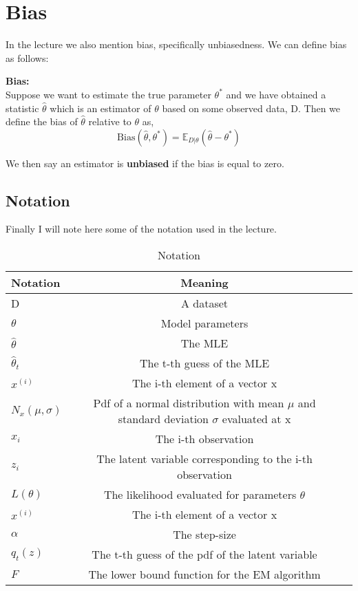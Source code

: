 \section{Bias}
In the lecture we also mention bias, specifically unbiasedness. We can define bias as follows:
\begin{definition}
    \textbf{Bias:} \\
    Suppose we want to estimate the true parameter $\theta^{*}$ and we have obtained a statistic $\hat{\theta}$ which is an estimator of $\theta$ based on some observed data, D. Then we define the bias of $\hat{\theta}$ relative to $\theta$ as,
    \begin{equation}
        \text{Bias}(\hat{\theta}, \theta^{*}) = \mathbb{E}_{D|\theta} (\hat{\theta} - \theta^{*})
    \end{equation}
\end{definition} 
We then say an estimator is \textbf{unbiased} if the bias is equal to zero.

\subsection{Notation}
Finally I will note here some of the notation used in the lecture.

\begin{table}[ht]
    \centering
    \begin{tabular}{|l|c|r|}
    \hline
    \textbf{Notation} & \textbf{Meaning}  \\
    \hline
    D & A dataset  \\
    \hline
    $\theta$ & Model parameters  \\
    \hline
    $\hat{\theta}$ & The MLE  \\
    \hline
    $\hat{\theta}_{t}$ & The t-th guess of the MLE \\
    \hline
    $x^{(i)}$ & The i-th element of a vector x  \\
    \hline
    $N_{x}(\mu, \sigma)$ & Pdf of a normal distribution with mean $\mu$ and standard deviation $\sigma$ evaluated at x  \\
    \hline
    $x_{i}$ & The i-th observation  \\
    \hline
    $z_{i}$ & The latent variable corresponding to the i-th observation \\
    \hline
    $L(\theta)$ & The likelihood evaluated for parameters $\theta$ \\
    \hline
    $x^{(i)}$ & The i-th element of a vector x  \\
    \hline
    $\alpha$ & The step-size  \\
    \hline
    $q_{t}(z)$ & The t-th guess of the pdf of the latent variable\\
    \hline
    $F$ & The lower bound function for the EM algorithm\\
    \hline
    \end{tabular}
    \caption{Notation}
\end{table}
    
